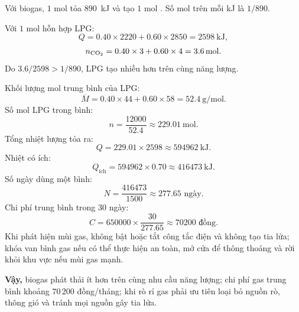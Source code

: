 \begin{loigiaiBT}
Với biogas, $1$ mol  tỏa \SI{890}{\kilo\joule} và tạo $1$ mol . Số mol  trên mỗi kJ là $1/890$.

Với $1$ mol hỗn hợp LPG:
\[
Q=0.40\times2220+0.60\times2850=\SI{2598}{\kilo\joule},
\]
\[
n_{\ce{CO2}}=0.40\times3+0.60\times4=\SI{3.6}{\mole}.
\]
Do $3.6/2598>1/890$, LPG tạo nhiều  hơn trên cùng năng lượng.

Khối lượng mol trung bình của LPG:
\[
\overline M=0.40\times44+0.60\times58=\SI{52.4}{\gram\per\mole}.
\]
Số mol LPG trong bình:
\[
n=\frac{12000}{52.4}\approx\SI{229.01}{\mole}.
\]
Tổng nhiệt lượng tỏa ra:
\[
Q=229.01\times2598\approx\SI{594962}{\kilo\joule}.
\]
Nhiệt có ích:
\[
Q_{\text{ích}}=594962\times0.70\approx\SI{416473}{\kilo\joule}.
\]
Số ngày dùng một bình:
\[
N=\frac{416473}{1500}\approx277.65\text{ ngày}.
\]
Chi phí trung bình trong 30 ngày:
\[
C=650000\times\frac{30}{277.65}\approx70200\text{ đồng}.
\]
Khi phát hiện mùi gas, không bật hoặc tắt công tắc điện và không tạo tia lửa; khóa van bình gas nếu có thể thực hiện an toàn, mở cửa để thông thoáng và rời khỏi khu vực nếu mùi gas mạnh.

\textbf{Vậy,} biogas phát thải ít  hơn trên cùng nhu cầu năng lượng; chi phí gas trung bình khoảng $70\,200$ đồng/tháng; khi rò rỉ gas phải ưu tiên loại bỏ nguồn rò, thông gió và tránh mọi nguồn gây tia lửa.
\end{loigiaiBT}
